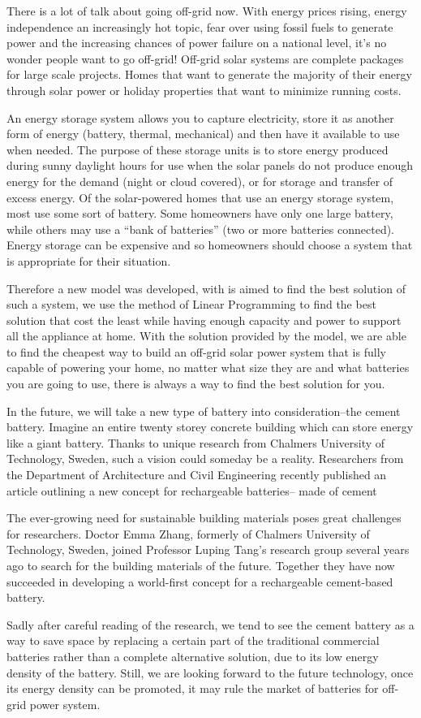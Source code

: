 \documentclass{article}
\begin{document}
There is a lot of talk about going off-grid now. With energy prices rising,
energy independence an increasingly hot topic, fear over using fossil fuels to generate power
and the increasing chances of power failure on a national level, it's no wonder people want to go off-grid!
Off-grid solar systems are complete packages for large scale projects. Homes
that want to generate the majority of their energy through solar power or holiday
properties that want to minimize running costs.\par
An energy storage system allows you to capture electricity, store it as another
form of energy (battery, thermal, mechanical) and then have it available to use
when needed. The purpose of these storage units is to store energy produced during
sunny daylight hours for use when the solar panels do not produce enough energy
for the demand (night or cloud covered), or for storage and transfer of excess energy.
Of the solar-powered homes that use an energy storage system, most use some sort
of battery. Some homeowners have only one large battery, while others may use
a “bank of batteries” (two or more batteries connected). Energy storage can be
expensive and so homeowners should choose a system that is appropriate for their
situation.\par
Therefore a new model was developed, with is aimed to find the best solution of such a system, we use the method of Linear Programming to find the best solution that cost the least while having enough capacity and
power to support all the appliance at home. With the solution provided by the model, we are able to find the cheapest way to build an off-grid
solar power system that is fully capable of powering your home, no matter what size they are and what batteries you are going to use, there is always a way to find the best solution for you.\par
In the future, we will take a new type of battery into consideration--the cement battery. Imagine an entire twenty storey concrete building which can store energy like a giant battery.
Thanks to unique research from Chalmers University of Technology, Sweden, such a vision
could someday be a reality. Researchers from the Department of Architecture and
Civil Engineering recently published an article outlining a new concept for rechargeable
batteries-- made of cement \par The ever-growing need for sustainable building materials poses great challenges for researchers. Doctor Emma Zhang, formerly of Chalmers University of Technology, Sweden, joined Professor Luping Tang’s research group several years ago to search for the building materials of the future. Together they have now succeeded in developing a world-first concept for a rechargeable cement-based battery. \par
Sadly after careful reading of the research, we tend to see the cement battery as  a way to save space by replacing a certain part of the traditional commercial batteries rather than a complete alternative solution, due to its low energy density of the battery. Still, we are looking forward to the future technology, once its energy density can be promoted, it may rule the market of batteries for off-grid power system.
\end{document}
